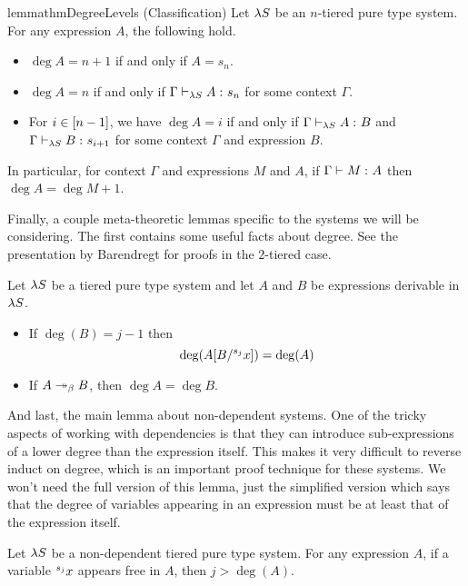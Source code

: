 \documentclass{article}
\begin{document}
\begin{restatable}{lemma}{thmDegreeLevels}
\label{lem:classification}
(Classification)
Let $\lS$ be an $n$-tiered pure type system.
For any expression $A$, the following hold.
\begin{itemize}
    \item $\deg A = n + 1$ if and only if $A = s_n$.
    \item $\deg A = n$ if and only if $\judgment[\lS] \Gamma A {s_n}$ for some context $\Gamma$.
    \item For $i \in \upto {n - 1}$, we have $\deg A = i$ if and only if $\judgment[\lS] \Gamma A B$ and $\judgment[\lS] \Gamma B {s_{i + 1}}$ for some context $\Gamma$ and expression $B$.
\end{itemize}
In particular, for context $\Gamma$ and expressions $M$ and $A$, if $\judgment \Gamma M A$ then $\deg A = \deg M + 1$.
\end{restatable}

Finally, a couple meta-theoretic lemmas specific to the systems we will be considering.
The first contains some useful facts about degree.
See the presentation by Barendregt \cite{barendregt-1993} for proofs in the $2$-tiered case.

\begin{lemma}
\label{lem:deg-facts}
Let $\lS$ be a tiered pure type system and let $A$ and $B$ be expressions derivable in $\lS$.
\begin{itemize}
\item If $\deg(B) = j - 1$ then
\[
\deg(\sub A B {\svar j x}) = \deg(A)
\]
\item If $A \multistepbeta B$, then $\deg A = \deg B$.
\end{itemize}
\end{lemma}

And last, the main lemma about non-dependent systems.
One of the tricky aspects of working with dependencies is that they can introduce sub-expressions of a lower degree than the expression itself.
This makes it very difficult to reverse induct on degree, which is an important proof technique for these systems.
We won't need the full version of this lemma, just the simplified version which says that the degree of variables appearing in an expression must be at least that of the expression itself.

\begin{lemma}
\label{lem:free-var-non-dep}
Let $\lS$ be a non-dependent tiered pure type system.
For any expression $A$, if a variable $\svar j x$ appears free in $A$, then $j > \deg(A)$.
\end{lemma}
\end{document}
